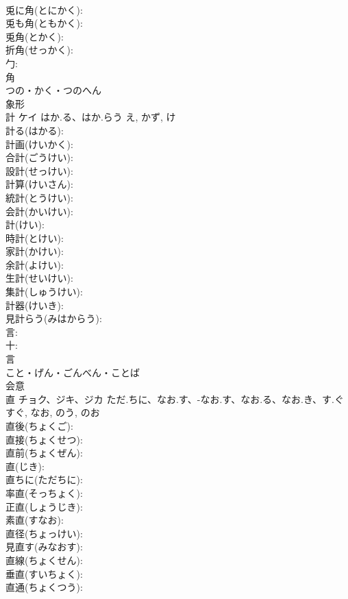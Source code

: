 \documentclass[8pt]{extreport}
\begin{document}
\begin{CJK}{UTF8}{min}
\\	兎に角(とにかく): 
\\	兎も角(ともかく): 
\\	兎角(とかく): 
\\	折角(せっかく): 
\\	勹: 
\\	角	
\\	つの・かく・つのへん	
\\	象形 
\\	計	ケイ	はか.る、はか.らう	え, かず, け	
\\	計る(はかる): 
\\	計画(けいかく): 
\\	合計(ごうけい): 
\\	設計(せっけい): 
\\	計算(けいさん): 
\\	統計(とうけい): 
\\	会計(かいけい): 
\\	計(けい): 
\\	時計(とけい): 
\\	家計(かけい): 
\\	余計(よけい): 
\\	生計(せいけい): 
\\	集計(しゅうけい): 
\\	計器(けいき): 
\\	見計らう(みはからう): 
\\	言: 
\\	十: 
\\	言	
\\	こと・げん・ごんべん・ことば	
\\	会意 
\\	直	チョク、ジキ、ジカ	ただ.ちに、なお.す、-なお.す、なお.る、なお.き、す.ぐ	すぐ, なお, のう, のお	
\\	直後(ちょくご): 
\\	直接(ちょくせつ): 
\\	直前(ちょくぜん): 
\\	直(じき): 
\\	直ちに(ただちに): 
\\	率直(そっちょく): 
\\	正直(しょうじき): 
\\	素直(すなお): 
\\	直径(ちょっけい): 
\\	見直す(みなおす): 
\\	直線(ちょくせん): 
\\	垂直(すいちょく): 
\\	直通(ちょくつう): 

\end{CJK}
\end{document}
